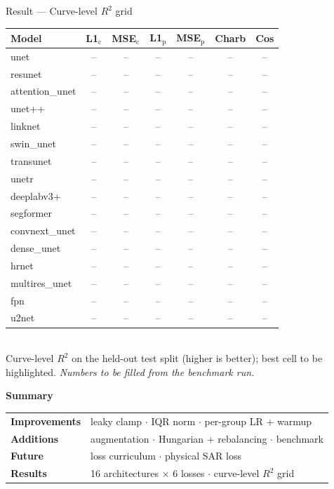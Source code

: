 \documentclass[aspectratio=169,10pt]{beamer}
\begin{document}
\begin{frame}{Result --- Curve-level $R^2$ grid}
  \centering \tiny
  \setlength{\tabcolsep}{4pt}\renewcommand{\arraystretch}{1.18}
  \begin{tabular}{lcccccc}
    \toprule
    Model & L1$_\text{c}$ & MSE$_\text{c}$ & L1$_\text{p}$ & MSE$_\text{p}$ & Charb & Cos \\
    \midrule
    unet            & -- & -- & -- & -- & -- & -- \\
    resunet         & -- & -- & -- & -- & -- & -- \\
    attention\_unet & -- & -- & -- & -- & -- & -- \\
    unet++          & -- & -- & -- & -- & -- & -- \\
    linknet         & -- & -- & -- & -- & -- & -- \\
    swin\_unet      & -- & -- & -- & -- & -- & -- \\
    transunet       & -- & -- & -- & -- & -- & -- \\
    unetr           & -- & -- & -- & -- & -- & -- \\
    deeplabv3+      & -- & -- & -- & -- & -- & -- \\
    segformer       & -- & -- & -- & -- & -- & -- \\
    convnext\_unet  & -- & -- & -- & -- & -- & -- \\
    dense\_unet     & -- & -- & -- & -- & -- & -- \\
    hrnet           & -- & -- & -- & -- & -- & -- \\
    multires\_unet  & -- & -- & -- & -- & -- & -- \\
    fpn             & -- & -- & -- & -- & -- & -- \\
    u2net           & -- & -- & -- & -- & -- & -- \\
    \bottomrule
  \end{tabular}
  \\[4pt]
  {\scriptsize Curve-level $R^2$ on the held-out test split (higher is better); best cell to
  be highlighted. \emph{Numbers to be filled from the benchmark run.}}
\end{frame}

\begin{frame}[plain]
  \centering\vfill
  {\large\bfseries\color{accent} Summary}\\[6pt]
  \small
  \begin{tabular}{ll}
    \textbf{Improvements} & leaky clamp $\cdot$ IQR norm $\cdot$ per-group LR + warmup \\[2pt]
    \textbf{Additions}    & augmentation $\cdot$ Hungarian + rebalancing $\cdot$ benchmark \\[2pt]
    \textbf{Future}       & loss curriculum $\cdot$ physical SAR loss \\[2pt]
    \textbf{Results}      & 16 architectures $\times$ 6 losses $\cdot$ curve-level $R^2$ grid \\
  \end{tabular}
  \vfill
\end{frame}
\end{document}
